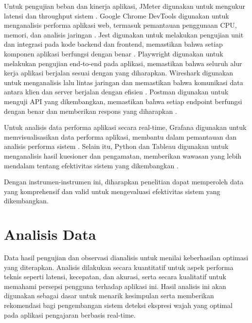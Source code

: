 Untuk pengujian beban dan kinerja aplikasi, JMeter digunakan untuk mengukur latensi dan throughput sistem \parencite{ksANALYSISTECHNIQUESQUALITY2017}. Google Chrome DevTools digunakan untuk menganalisis performa aplikasi web, termasuk pemantauan penggunaan CPU, memori, dan analisis jaringan \parencite{jinImpactExtensionsBrowser2024}. Jest digunakan untuk melakukan pengujian unit dan integrasi pada kode backend dan frontend, memastikan bahwa setiap komponen aplikasi berfungsi dengan benar \parencite{bykovWebApplicationDevelopment2020}. Playwright digunakan untuk melakukan pengujian end-to-end pada aplikasi, memastikan bahwa seluruh alur kerja aplikasi berjalan sesuai dengan yang diharapkan. Wireshark digunakan untuk menganalisis lalu lintas jaringan dan memastikan bahwa komunikasi data antara klien dan server berjalan dengan efisien \parencite{chenApplicationWebSocket2018}. Postman digunakan untuk menguji API yang dikembangkan, memastikan bahwa setiap endpoint berfungsi dengan benar dan memberikan respons yang diharapkan \parencite{phankokkruadRealtimeFaceRecognition2016}.

Untuk analisis data performa aplikasi secara real-time, Grafana digunakan untuk memvisualisasikan data performa aplikasi, membantu dalam pemantauan dan analisis performa sistem \parencite{ogundeyiWebSocketRealTime2019}. Selain itu, Python dan Tableau digunakan untuk menganalisis hasil kuesioner dan pengamatan, memberikan wawasan yang lebih mendalam tentang efektivitas sistem yang dikembangkan \parencite{fowdurRealtimeMachineLearning2024}.

Dengan instrumen-instrumen ini, diharapkan penelitian dapat memperoleh data yang komprehensif dan valid untuk mengevaluasi efektivitas sistem yang dikembangkan.

\section{Analisis Data}
Data hasil pengujian dan observasi dianalisis untuk menilai keberhasilan optimasi yang diterapkan. Analisis dilakukan secara kuantitatif untuk aspek performa teknis seperti latensi, kecepatan, dan akurasi, serta secara kualitatif untuk memahami persepsi pengguna terhadap aplikasi ini. Hasil analisis ini akan digunakan sebagai dasar untuk menarik kesimpulan serta memberikan rekomendasi bagi pengembangan sistem deteksi ekspresi wajah yang optimal pada aplikasi pengajaran berbasis real-time.
